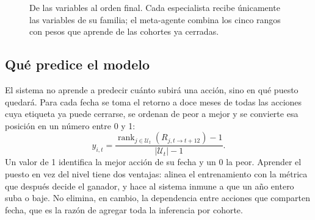 \begin{figure}[htbp]
  \centering
  \caption{De las variables al orden final. Cada especialista recibe únicamente las variables de su
  familia; el meta-agente combina los cinco rangos con pesos que aprende de las cohortes ya
  cerradas.}
  \label{fig:arquitectura}
\end{figure}

\subsection{Qué predice el modelo}

El sistema no aprende a predecir cuánto subirá una acción, sino en qué puesto quedará. Para cada
fecha se toma el retorno a doce meses de todas las acciones cuya etiqueta ya puede cerrarse, se
ordenan de peor a mejor y se convierte esa posición en un número entre 0 y 1:
\[
 y_{i,t}=\frac{\operatorname{rank}_{j\in\mathcal U_t}
 \left(R_{j,t\rightarrow t+12}\right)-1}{|\mathcal U_t|-1}.
\]
Un valor de 1 identifica la mejor acción de su fecha y un 0 la peor. Aprender el puesto en vez del
nivel tiene dos ventajas: alinea el entrenamiento con la métrica que después decide el ganador, y
hace al sistema inmune a que un año entero suba o baje. No elimina, en cambio, la dependencia entre
acciones que comparten fecha, que es la razón de agregar toda la inferencia por cohorte.

